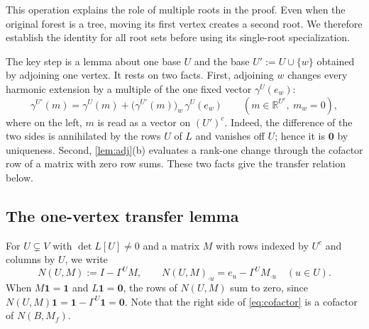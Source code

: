 \documentclass[onefignum,onetabnum,nohypdvips]{siamart250211}
\numberwithin{theorem}{section}
\numberwithin{equation}{section}
\newcommand{\R}{\mathbb{R}}
\newcommand{\one}{\mathbf{1}}
\newcommand{\zero}{\mathbf{0}}
\begin{document}
This operation explains the role of multiple roots in the proof.
Even when the original forest is a tree, moving its first vertex
creates a second root. We therefore establish the identity for all
root sets before using its single-root specialization.

The key step is a lemma about one base $U$ and the base
$U':=U\cup\{w\}$ obtained by adjoining one vertex. It rests on two
facts. First, adjoining $w$ changes every harmonic extension by a
multiple of the one fixed vector $\gamma^{U}(e_w)$:
\begin{equation}\label{eq:onestep}
\gamma^{U'}(m)=\gamma^{U}(m)+\big(\gamma^{U'}(m)\big)_w\,\gamma^{U}(e_w)
\qquad(m\in\R^{U^c},\ m_w=0),
\end{equation}
where on the left, $m$ is read as a vector on $(U')^c$. Indeed, the
difference of the two sides is annihilated by the rows $U$ of $L$ and
vanishes off $U$; hence it is $\zero$ by uniqueness. Second, \cref{lem:adj}(b) evaluates a rank-one change through the
cofactor row of a matrix with zero row sums. These two facts give the
transfer relation below.

\subsection{The one-vertex transfer lemma}

For $U\subsetneq V$ with $\det L[U]\ne0$ and a matrix $M$ with rows
indexed by $U^c$ and columns by $U$, we write
\begin{equation}\label{eq:N}
N(U,M):=I-\Gamma^UM,\qquad
N(U,M)_{\cdot u}=e_u-\Gamma^UM_{\cdot u}\quad(u\in U).
\end{equation}
When $M\one=\one$ and $L\one=\zero$, the rows of $N(U,M)$ sum to zero,
since $N(U,M)\one=\one-\Gamma^U\one=\zero$. Note that the right side of
\eqref{eq:cofactor} is a cofactor of $N(B,M_f)$.
\end{document}

